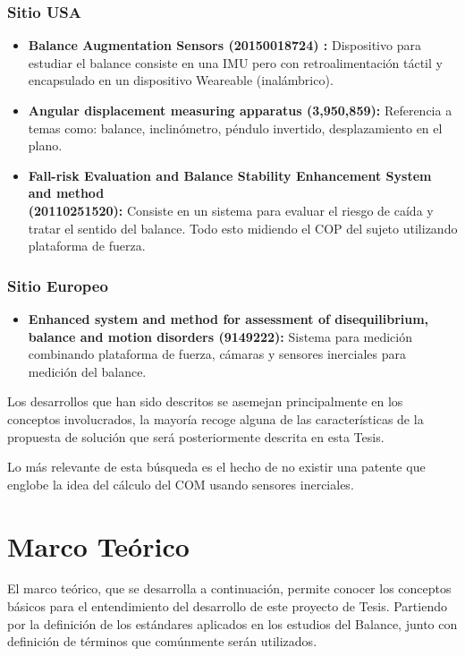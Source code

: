 \documentclass[12pt,a4paper]{article}
\begin{document}
\subsubsection{Sitio USA}
\begin{itemize}
	\item \textbf{Balance Augmentation Sensors (20150018724) :} Dispositivo para estudiar el balance consiste en una IMU pero con retroalimentación táctil y encapsulado en un dispositivo Weareable (inalámbrico).
	\item \textbf{Angular displacement measuring apparatus (3,950,859): } Referencia a temas como: balance, inclinómetro, péndulo invertido, desplazamiento en el plano.
	\item \textbf{Fall-risk Evaluation and Balance Stability Enhancement System and method \\(20110251520):} 
	Consiste en un sistema para evaluar el riesgo de caída y tratar el sentido del balance. Todo esto midiendo el COP del sujeto utilizando plataforma de fuerza.
\end{itemize}

\subsubsection{Sitio Europeo}
\begin{itemize}
	\item \textbf{Enhanced system and method for assessment of disequilibrium, balance and motion disorders (9149222):} Sistema para medición combinando plataforma de fuerza, cámaras y sensores inerciales para medición del balance.
\end{itemize}

Los desarrollos que han sido descritos se asemejan principalmente en los conceptos involucrados, la mayoría recoge alguna de las características de la propuesta de solución que será posteriormente descrita en esta Tesis.

Lo más relevante de esta búsqueda es el hecho de no existir una patente que englobe la idea del cálculo del COM usando sensores inerciales.

\section{Marco Teórico}

El marco teórico, que se desarrolla a continuación, permite conocer los conceptos básicos para el entendimiento del desarrollo de este proyecto de Tesis.
Partiendo por la definición de los estándares aplicados en los estudios del Balance, junto con definición de términos que comúnmente serán utilizados.
\end{document}
